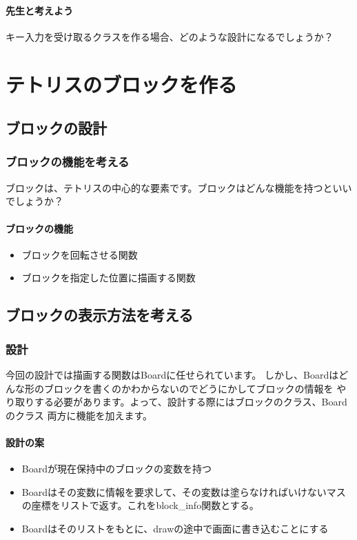 \documentclass[12pt, a4paper, dvipdfmx]{book}
\begin{document}
\subsubsection{先生と考えよう}
キー入力を受け取るクラスを作る場合、どのような設計になるでしょうか？

\chapter{テトリスのブロックを作る}
\section{ブロックの設計}
\subsection{ブロックの機能を考える}
ブロックは、テトリスの中心的な要素です。ブロックはどんな機能を持つといいでしょうか？
\subsubsection{ブロックの機能}
\begin{itemize}
  \item ブロックを回転させる関数
  \item ブロックを指定した位置に描画する関数
\end{itemize}

\section{ブロックの表示方法を考える}
\subsection{設計}
今回の設計では描画する関数はBoardに任せられています。
しかし、Boardはどんな形のブロックを書くのかわからないのでどうにかしてブロックの情報を
やり取りする必要があります。よって、設計する際にはブロックのクラス、Boardのクラス
両方に機能を加えます。
\subsubsection{設計の案}
\begin{itemize}
  \item Boardが現在保持中のブロックの変数を持つ
  \item Boardはその変数に情報を要求して、その変数は塗らなければいけないマスの座標をリストで返す。これをblock\_info関数とする。
  \item Boardはそのリストをもとに、drawの途中で画面に書き込むことにする
\end{itemize}
\end{document}
